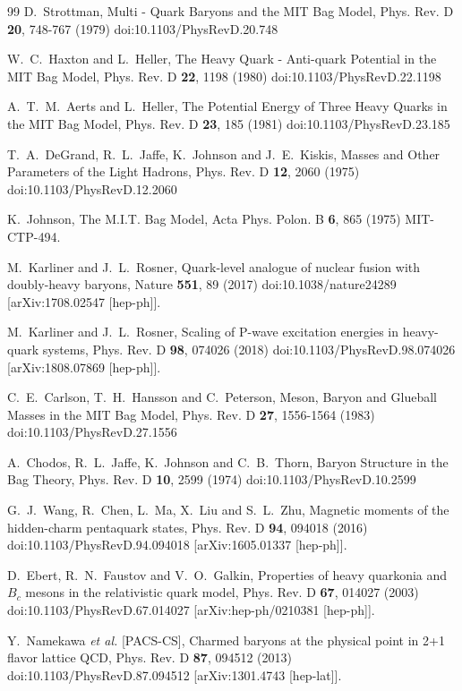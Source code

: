 \documentclass[prd,twocolumn,floatfix,nofootinbib]{revtex4}
\begin{document}
\begin{thebibliography}{99}
 D.~Strottman, Multi - Quark Baryons and the MIT
Bag Model, Phys. Rev. D \textbf{20}, 748-767 (1979)
doi:10.1103/PhysRevD.20.748

 W.~C.~Haxton and L.~Heller, The Heavy Quark -
Anti-quark Potential in the {MIT} Bag Model, Phys. Rev. D \textbf{22}, 1198
(1980) doi:10.1103/PhysRevD.22.1198

 A.~T.~M.~Aerts and L.~Heller, The Potential Energy of
Three Heavy Quarks in the {MIT} Bag Model, Phys. Rev. D \textbf{23}, 185
(1981) doi:10.1103/PhysRevD.23.185

 T.~A.~DeGrand, R.~L.~Jaffe, K.~Johnson and
J.~E.~Kiskis, Masses and Other Parameters of the Light Hadrons, Phys. Rev. D
\textbf{12}, 2060 (1975) doi:10.1103/PhysRevD.12.2060

 K.~Johnson, The M.I.T. Bag Model, Acta Phys. Polon.
B \textbf{6}, 865 (1975) MIT-CTP-494.

 M.~Karliner and J.~L.~Rosner, Quark-level
analogue of nuclear fusion with doubly-heavy baryons, Nature \textbf{551},
89 (2017) doi:10.1038/nature24289 [arXiv:1708.02547 [hep-ph]].

 M.~Karliner and J.~L.~Rosner, Scaling of P-wave
excitation energies in heavy-quark systems, Phys. Rev. D \textbf{98}, 074026
(2018) doi:10.1103/PhysRevD.98.074026 [arXiv:1808.07869 [hep-ph]].

 C.~E.~Carlson, T.~H.~Hansson and C.~Peterson,
Meson, Baryon and Glueball Masses in the MIT Bag Model, Phys. Rev. D \textbf{%
27}, 1556-1564 (1983) doi:10.1103/PhysRevD.27.1556

 A.~Chodos, R.~L.~Jaffe, K.~Johnson and C.~B.~Thorn,
Baryon Structure in the Bag Theory, Phys. Rev. D \textbf{10}, 2599 (1974)
doi:10.1103/PhysRevD.10.2599

 G.~J.~Wang, R.~Chen, L.~Ma, X.~Liu and S.~L.~Zhu,
Magnetic moments of the hidden-charm pentaquark states, Phys. Rev. D \textbf{%
94}, 094018 (2016) doi:10.1103/PhysRevD.94.094018 [arXiv:1605.01337
[hep-ph]].

 D.~Ebert, R.~N.~Faustov and V.~O.~Galkin, Properties
of heavy quarkonia and $B_c$ mesons in the relativistic quark model, Phys.
Rev. D \textbf{67}, 014027 (2003) doi:10.1103/PhysRevD.67.014027
[arXiv:hep-ph/0210381 [hep-ph]].

 Y.~Namekawa \textit{et al.} [PACS-CS], Charmed
baryons at the physical point in 2+1 flavor lattice QCD, Phys. Rev. D
\textbf{87}, 094512 (2013) doi:10.1103/PhysRevD.87.094512 [arXiv:1301.4743
[hep-lat]].


\end{thebibliography}
\end{document}
